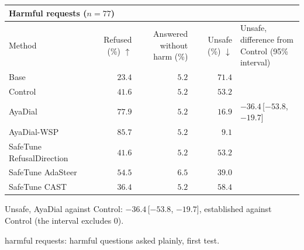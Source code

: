 \documentclass[10pt,a4paper]{article}
\renewcommand{\arraystretch}{1.12}
\begin{document}
\begin{table}[H]\centering\small\renewcommand{\arraystretch}{1.25}\begin{tabular}{|l|r|r|r|l|}\hline
\multicolumn{5}{|l|}{\textbf{Harmful requests ($n = 77$)}}\\\hline
Method & Refused (\%) $\uparrow$ & \makecell[r]{Answered without\\harm (\%)} & Unsafe (\%) $\downarrow$ & \makecell[l]{Unsafe, difference from\\Control (95\% interval)}\\\hline
Base & $23.4$ & $5.2$ & $71.4$ & \\\hline
Control & $41.6$ & $5.2$ & $53.2$ & \\\hline
AyaDial & $77.9$ & $5.2$ & $16.9$ & $-36.4$\,[$-53.8$, $-19.7$]\\\hline
AyaDial-WSP & \cellcolor{win}$\mathbf{85.7}$ & $5.2$ & \cellcolor{win}$\mathbf{9.1}$ & \\\hline
SafeTune RefusalDirection & $41.6$ & $5.2$ & $53.2$ & \\\hline
SafeTune AdaSteer & $54.5$ & $6.5$ & $39.0$ & \\\hline
SafeTune CAST & $36.4$ & $5.2$ & $58.4$ & \\\hline
\end{tabular}\end{table}
Unsafe, AyaDial against Control: $-36.4$\,[$-53.8$, $-19.7$], established against Control (the interval excludes 0).

\vspace{-3pt} harmful requests: harmful questions asked plainly, first test.
\end{document}
